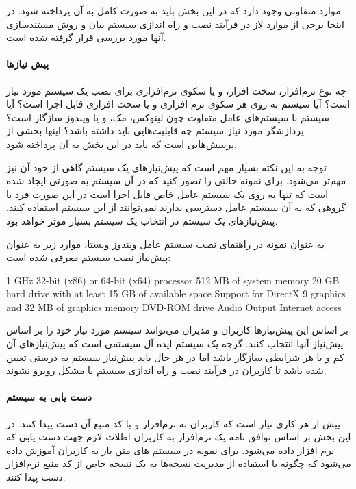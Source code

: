   موارد متفاوتی وجود دارد که در این بخش باید به صورت کامل به آن پرداخته شود. در
  اینجا برخی از موارد لاز در فرآیند نصب و راه اندازی سیستم بیان و 
روش مستندسازی آنها مورد بررسی قرار گرفته شده است.


\paragraph{پیش نیازها}
   چه نوع نرم‌افزار، سخت افزار، و یا سکوی نرم‌افزاری برای نصب یک سیستم مورد نیاز
   است؟ آیا سیستم به روی هر سکوی نرم افزاری و یا سخت افزاری قابل اجرا است؟ آیا
   سیستم با سیستم‌های عامل متفاوت چون لینوکس، مک، و یا ویندوز سازگار است؟
   پردازشگر مورد نیاز سیستم چه قابلیت‌هایی باید داشته باشد؟ اینها بخشی از
   پرسش‌هایی است که باید در این بخش به آن پرداخته شود.

   توجه به این نکته بسیار مهم است که پیش‌نیازهای یک سیستم گاهی از خود آن نیز
   مهم‌تر می‌شود. برای نمونه حالتی را تصور کنید که در آن سیستم به صورتی ایجاد
   شده است که تنها به روی یک سیستم عامل خاص قابل اجرا است در این صورت فرد یا
   گروهی که به آن سیستم عامل دسترسی ندارند نمی‌توانند از این سیستم استفاده کنند.
   پیش‌نیازهای یک سیستم در انتخاب یک سیستم بسیار موثر خواهد بود.

   به عنوان نمونه در راهنمای نصب سیستم عامل ویندوز ویستا، موارد زیر به عنوان
   پیش‌نیاز نصب سیستم معرفی شده است:
\begin{config}
1 GHz 32-bit (x86) or 64-bit (x64) processor
512 MB of system memory
20 GB hard drive with at least 15 GB of available space
Support for DirectX 9 graphics and 32 MB of graphics memory
DVD-ROM drive
Audio Output
Internet access
\end{config}
   بر اساس این پیش‌نیازها کاربران و مدیران می‌توانند سیستم مورد نیاز
   خود را بر اساس پیش‌نیاز آنها انتخاب کنند. گرچه یک سیستم ایده آل سیستمی است که پیش‌نیازهای آن کم و
   با هر شرایطی سازگار باشد اما در هر حال باید پیش‌نیاز سیستم به درستی تعیین شده
   باشد تا کاربران در فرآیند نصب و راه اندازی سیستم با مشکل روبرو نشوند.
   
\paragraph{دست یابی به سیستم}
  پیش از هر کاری نیاز است که کاربران به نرم‌افزار و یا کد منبع آن دست پیدا کنند.
  در این بخش بر اساس توافق نامه یک نرم‌افزار به کاربران اطلات لازم جهت دست یابی
  که نرم افزار داده می‌شود. برای نمونه در سیستم های متن باز به کاربران آموزش
  داده می‌شود که چگونه با استفاده از مدیریت نسخه‌ها به یک نسخه خاص از کد منبع
  نرم‌افزار دست پیدا کنند.
  
